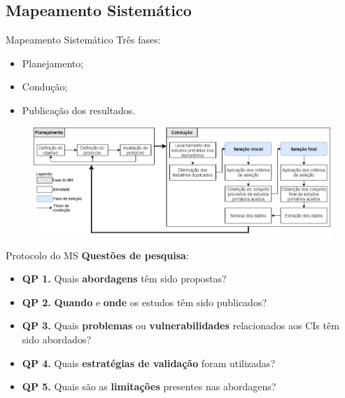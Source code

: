 \subsection{Mapeamento Sistemático}
\begin{frame}{Mapeamento Sistemático}
    Três fases:
    \begin{itemize}
        \item Planejamento;
        \item Condução;
        \item Publicação dos resultados.
    \end{itemize}
    \begin{figure}[!htb]
		\centering
		\includegraphics[scale=0.3]{figuras/metodologia/ms_fluxo.png}
	\end{figure}
\end{frame}

\begin{frame}{Protocolo do MS}
\textbf{Questões de pesquisa}:
    \begin{itemize}
        \item \textbf{QP 1.} Quais \textbf{abordagens} têm sido propostas?
        \item \textbf{QP 2.} \textbf{Quando} e \textbf{onde} os estudos têm sido publicados?
        \item \textbf{QP 3.} Quais \textbf{problemas} ou \textbf{vulnerabilidades} relacionados aos CIs têm sido abordados?
        \item \textbf{QP 4.} Quais \textbf{estratégias de validação} foram utilizadas?
        \item \textbf{QP 5.} Quais são as \textbf{limitações} presentes nas abordagens?
    \end{itemize}    
\end{frame}


